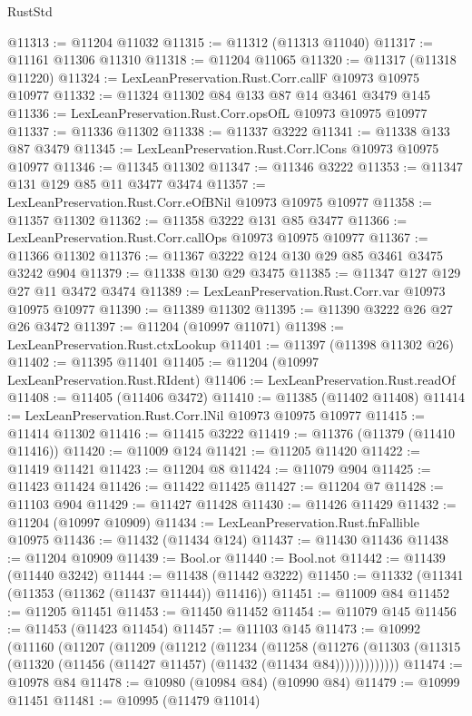 \begin{lexlean}{RustStd}
\begin{coremodule}
@11313 := @11204 @11032
@11315 := @11312 (@11313 @11040)
@11317 := @11161 @11306 @11310
@11318 := @11204 @11065
@11320 := @11317 (@11318 @11220)
@11324 := LexLeanPreservation.Rust.Corr.callF @10973 @10975 @10977
@11332 := @11324 @11302 @84 @133 @87 @14 @3461 @3479 @145
@11336 := LexLeanPreservation.Rust.Corr.opsOfL @10973 @10975 @10977
@11337 := @11336 @11302
@11338 := @11337 @3222
@11341 := @11338 @133 @87 @3479
@11345 := LexLeanPreservation.Rust.Corr.lCons @10973 @10975 @10977
@11346 := @11345 @11302
@11347 := @11346 @3222
@11353 := @11347 @131 @129 @85 @11 @3477 @3474
@11357 := LexLeanPreservation.Rust.Corr.eOfBNil @10973 @10975 @10977
@11358 := @11357 @11302
@11362 := @11358 @3222 @131 @85 @3477
@11366 := LexLeanPreservation.Rust.Corr.callOps @10973 @10975 @10977
@11367 := @11366 @11302
@11376 := @11367 @3222 @124 @130 @29 @85 @3461 @3475 @3242 @904
@11379 := @11338 @130 @29 @3475
@11385 := @11347 @127 @129 @27 @11 @3472 @3474
@11389 := LexLeanPreservation.Rust.Corr.var @10973 @10975 @10977
@11390 := @11389 @11302
@11395 := @11390 @3222 @26 @27 @26 @3472
@11397 := @11204 (@10997 @11071)
@11398 := LexLeanPreservation.Rust.ctxLookup
@11401 := @11397 (@11398 @11302 @26)
@11402 := @11395 @11401
@11405 := @11204 (@10997 LexLeanPreservation.Rust.RIdent)
@11406 := LexLeanPreservation.Rust.readOf
@11408 := @11405 (@11406 @3472)
@11410 := @11385 (@11402 @11408)
@11414 := LexLeanPreservation.Rust.Corr.lNil @10973 @10975 @10977
@11415 := @11414 @11302
@11416 := @11415 @3222
@11419 := @11376 (@11379 (@11410 @11416))
@11420 := @11009 @124
@11421 := @11205 @11420
@11422 := @11419 @11421
@11423 := @11204 @8
@11424 := @11079 @904
@11425 := @11423 @11424
@11426 := @11422 @11425
@11427 := @11204 @7
@11428 := @11103 @904
@11429 := @11427 @11428
@11430 := @11426 @11429
@11432 := @11204 (@10997 @10909)
@11434 := LexLeanPreservation.Rust.fnFallible @10975
@11436 := @11432 (@11434 @124)
@11437 := @11430 @11436
@11438 := @11204 @10909
@11439 := Bool.or
@11440 := Bool.not
@11442 := @11439 (@11440 @3242)
@11444 := @11438 (@11442 @3222)
@11450 := @11332 (@11341 (@11353 (@11362 (@11437 @11444)) @11416))
@11451 := @11009 @84
@11452 := @11205 @11451
@11453 := @11450 @11452
@11454 := @11079 @145
@11456 := @11453 (@11423 @11454)
@11457 := @11103 @145
@11473 := @10992
    (@11160
      (@11207
        (@11209
          (@11212
            (@11234
              (@11258
                (@11276
                  (@11303 (@11315 (@11320 (@11456 (@11427 @11457) (@11432 (@11434 @84)))))))))))))
@11474 := @10978 @84
@11478 := @10980 (@10984 @84) (@10990 @84)
@11479 := @10999 @11451
@11481 := @10995 (@11479 @11014)

\end{coremodule}
\end{lexlean}
